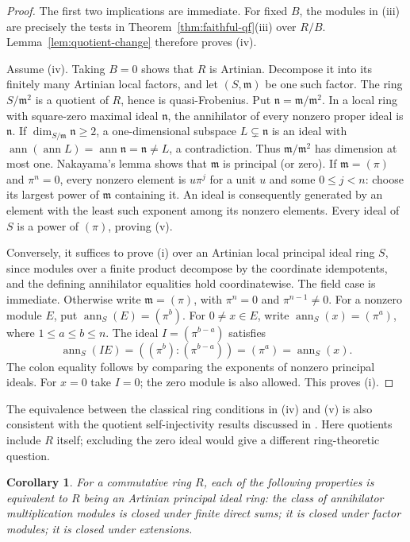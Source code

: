 \documentclass[11pt]{amsart}
\theoremstyle{plain}
\newtheorem{corollary}[theorem]{Corollary}
\theoremstyle{definition}
\theoremstyle{remark}
\newcommand{\ann}{\operatorname{ann}}
\numberwithin{equation}{section}
\begin{document}
\begin{proof}
The first two implications are immediate. For fixed $B$, the modules
in (iii) are precisely the tests in Theorem~\ref{thm:faithful-qf}(iii)
over $R/B$. Lemma~\ref{lem:quotient-change} therefore proves (iv).

Assume (iv). Taking $B=0$ shows that $R$ is Artinian.
Decompose it into its finitely many Artinian local factors, and let
$(S,\mathfrak m)$ be one such factor. The ring $S/\mathfrak m^2$ is
a quotient of $R$, hence is quasi-Frobenius.
Put $\mathfrak n=\mathfrak m/\mathfrak m^2$.
In a local ring with square-zero maximal ideal $\mathfrak n$, the
annihilator of every nonzero proper ideal is $\mathfrak n$.
If $\dim_{S/\mathfrak m}\mathfrak n\ge2$, a one-dimensional subspace
$L\subsetneq\mathfrak n$ is an ideal with
$\ann(\ann L)=\ann\mathfrak n=\mathfrak n\ne L$, a contradiction.
Thus $\mathfrak m/\mathfrak m^2$ has dimension at most one.
Nakayama's lemma shows that $\mathfrak m$ is principal (or zero).
If $\mathfrak m=(\pi)$ and $\pi^n=0$, every nonzero element is
$u\pi^j$ for a unit $u$ and some $0\le j<n$: choose its largest
power of $\mathfrak m$ containing it. An ideal is consequently generated
by an element with the least such exponent among its nonzero elements.
Every ideal of $S$ is a power of $(\pi)$, proving (v).

Conversely, it suffices to prove (i) over an Artinian local principal
ideal ring $S$, since modules over a finite product decompose by the
coordinate idempotents, and the defining annihilator equalities hold
coordinatewise. The field case is immediate. Otherwise write
$\mathfrak m=(\pi)$, with $\pi^n=0$ and $\pi^{n-1}\ne0$.
For a nonzero module $E$, put $\ann_S(E)=(\pi^b)$.
For $0\ne x\in E$, write $\ann_S(x)=(\pi^a)$, where
$1\le a\le b\le n$. The ideal $I=(\pi^{b-a})$ satisfies
\[
 \ann_S(IE)=((\pi^b):(\pi^{b-a}))=(\pi^a)=\ann_S(x).
\]
The colon equality follows by comparing the exponents of nonzero
principal ideals. For $x=0$ take $I=0$; the zero module is also allowed.
This proves (i).
\end{proof}

The equivalence between the classical ring conditions in (iv) and (v)
is also consistent with the quotient self-injectivity results discussed
in \cite{Storrer69}. Here quotients include $R$ itself; excluding the
zero ideal would give a different ring-theoretic question.

\begin{corollary}\label{cor:closure-pir}
For a commutative ring $R$, each of the following properties is equivalent
to $R$ being an Artinian principal ideal ring: the class of annihilator
multiplication modules is closed under finite direct sums; it is closed
under factor modules; it is closed under extensions.
\end{corollary}
\end{document}

